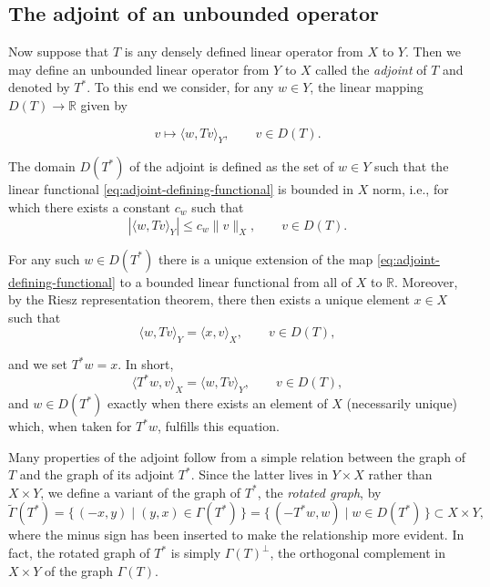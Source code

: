 \subsection{{The adjoint of an unbounded operator}}\label{sec:unbounded-adjoint}

{Now suppose that $T$ is any densely defined linear operator from $X$ to $Y$. Then we may define an unbounded linear operator from $Y$ to $X$ called the \emph{adjoint} of $T$ and denoted by $T^*$. To this end we consider, for any $w\in Y$, the linear mapping $D(T)\to\mathbb R$ given by}

\begin{equation}\label{eq:adjoint-defining-functional}
v\mapsto\langle w,Tv\rangle_Y,\qquad v\in D(T).
\end{equation}

{The domain $D(T^*)$ of the adjoint is defined as the set of $w\in Y$ such that the linear functional \eqref{eq:adjoint-defining-functional} is bounded in $X$ norm, i.e., for which there exists a constant $c_w$ such that}
\[
|\langle w,Tv\rangle_Y|\leq c_w\|v\|_X,\qquad v\in D(T).
\]

{For any such $w\in D(T^*)$ there is a unique extension of the map \eqref{eq:adjoint-defining-functional} to a bounded linear functional from all of $X$ to $\mathbb R$. Moreover, by the Riesz representation theorem, there then exists a unique element $x\in X$ such that}
\begin{equation}\label{eq:adjoint-riesz-identity}
\langle w,Tv\rangle_Y=\langle x,v\rangle_X,\qquad v\in D(T),
\end{equation}

{and we set $T^*w=x$. In short,}
\[
\langle T^*w,v\rangle_X=\langle w,Tv\rangle_Y,\qquad v\in D(T),
\]
{and $w\in D(T^*)$ exactly when there exists an element of $X$ (necessarily unique) which, when taken for $T^*w$, fulfills this equation.}

{Many properties of the adjoint follow from a simple relation between the graph of $T$ and the graph of its adjoint $T^*$. Since the latter lives in $Y\times X$ rather than $X\times Y$, we define a variant of the graph of $T^*$, the \emph{rotated graph}, by}
\[
\widetilde\Gamma(T^*)=\{\,(-x,y)\mid(y,x)\in\Gamma(T^*)\,\}=\{\,(-T^*w,w)\mid w\in D(T^*)\,\}\subset X\times Y,
\]
{where the minus sign has been inserted to make the relationship more evident. In fact, the rotated graph of $T^*$ is simply $\Gamma(T)^\perp$, the orthogonal complement in $X\times Y$ of the graph $\Gamma(T)$.}

